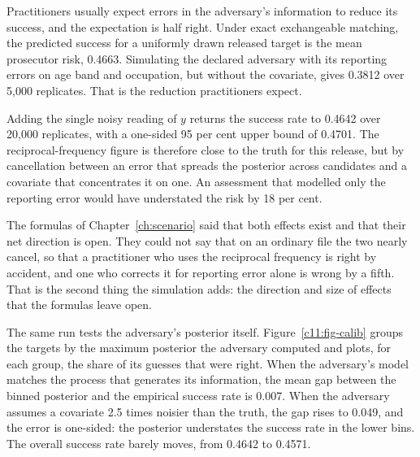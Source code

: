 Practitioners usually expect errors in the adversary's information to reduce its
success, and the expectation is half right. Under exact exchangeable matching, the
predicted success for a uniformly drawn released target is the mean prosecutor risk,
0.4663. Simulating the declared adversary with its reporting errors on age band and
occupation, but without the covariate, gives 0.3812 over 5,000 replicates. That is
the reduction practitioners expect.

Adding the single noisy reading of $y$ returns the success rate to 0.4642 over
20,000 replicates, with a one-sided 95 per cent upper bound of 0.4701.
The reciprocal-frequency figure is therefore close to the truth for this release,
but by cancellation between an error that spreads the posterior across candidates
and a covariate that concentrates it on one. An assessment that modelled only the
reporting error would have understated the risk by 18 per cent.

The formulas of Chapter~\ref{ch:scenario} said that both effects exist and that
their net direction is open. They could not say that on an ordinary file the two
nearly cancel, so that a practitioner who uses the reciprocal frequency is right by
accident, and one who corrects it for reporting error alone is wrong by a fifth.
That is the second thing the simulation adds: the direction and size of effects that
the formulas leave open.

The same run tests the adversary's posterior itself. Figure~\ref{c11:fig-calib}
groups the targets by the maximum posterior the adversary computed and plots, for
each group, the share of its guesses that were right. When the adversary's model
matches the process that generates its information, the mean gap between the binned
posterior and the empirical success rate is 0.007. When the adversary assumes a
covariate 2.5 times noisier than the truth, the gap rises to 0.049, and the error
is one-sided: the posterior understates the success rate in the lower bins. The
overall success rate barely moves, from 0.4642 to 0.4571.

